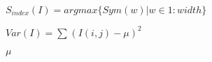 \documentclass{article}
\begin{document}
$ S_{index}(I) = argmax\{ Sym(w) | w \in 1:width\} $
\pagebreak

$ Var(I) = \sum_{}^{} (I(i,j) - \mu )^2 $
\pagebreak

$ \mu $
\pagebreak
\end{document}
